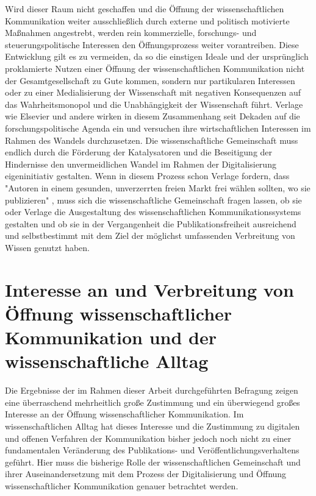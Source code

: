 Wird dieser Raum nicht geschaffen und die Öffnung der wissenschaftlichen Kommunikation weiter ausschließlich durch externe und politisch motivierte Maßnahmen angestrebt, werden rein kommerzielle, forschungs- und steuerungspolitische Interessen den Öffnungsprozess weiter vorantreiben. Diese Entwicklung gilt es zu vermeiden, da so die einstigen Ideale und der ursprünglich proklamierte Nutzen einer Öffnung der wissenschaftlichen Kommunikation nicht der Gesamtgesellschaft zu Gute kommen, sondern nur partikularen Interessen oder zu einer Medialisierung der Wissenschaft mit negativen Konsequenzen auf das Wahrheitsmonopol und die Unabhängigkeit der Wissenschaft führt. Verlage wie Elsevier und andere wirken in diesem Zusammenhang seit Dekaden auf die forschungspolitische Agenda ein und versuchen ihre wirtschaftlichen Interessen im Rahmen des Wandels durchzusetzen. Die wissenschaftliche Gemeinschaft muss endlich durch die Förderung der Katalysatoren und die Beseitigung der Hindernisse den unvermeidlichen Wandel im Rahmen der Digitalisierung eigeninitiativ gestalten. Wenn in diesem Prozess schon Verlage fordern, dass "Autoren in einem gesunden, unverzerrten freien Markt frei wählen sollten, wo sie publizieren" \cite{Brussels_Declaration_2007}, muss sich die wissenschaftliche Gemeinschaft fragen lassen, ob sie oder Verlage die Ausgestaltung des wissenschaftlichen Kommunikationssystems gestalten und ob sie in der Vergangenheit die Publikationsfreiheit ausreichend und selbstbestimmt mit dem Ziel der möglichst umfassenden Verbreitung von Wissen genutzt haben.

\section{Interesse an und Verbreitung von Öffnung wissenschaftlicher Kommunikation und der wissenschaftliche Alltag}

Die Ergebnisse der im Rahmen dieser Arbeit durchgeführten Befragung zeigen eine überraschend mehrheitlich große Zustimmung und ein überwiegend großes Interesse an der Öffnung wissenschaftlicher Kommunikation. Im wissenschaftlichen Alltag hat dieses Interesse und die Zustimmung zu digitalen und offenen Verfahren der Kommunikation bisher jedoch noch nicht zu einer fundamentalen Veränderung des Publikations- und Veröffentlichungsverhaltens geführt. Hier muss die bisherige Rolle der wissenschaftlichen Gemeinschaft und ihrer Auseinandersetzung mit dem Prozess der Digitalisierung und Öffnung wissenschaftlicher Kommunikation genauer betrachtet werden.

